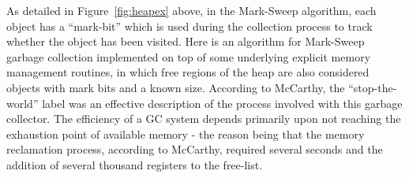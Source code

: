 \documentclass[11pt,leqno]{article}
\begin{document}
As detailed in Figure~\ref{fig:heapex} above, in the Mark-Sweep algorithm, each object has a “mark-bit” which is used during the collection process to track whether the object has been visited. Here is an algorithm for Mark-Sweep garbage collection implemented on top of some underlying explicit memory management routines, in which free regions of the heap are also considered objects with mark bits and a known size. According to McCarthy\cite{mccarthy}, the ``stop-the-world'' label was an effective description of the process involved with this garbage collector. The efficiency of a GC system depends primarily upon not reaching the exhaustion point of available memory - the reason being that the memory reclamation process, according to McCarthy, required several seconds and the addition of several thousand registers to the free-list.
\end{document}
